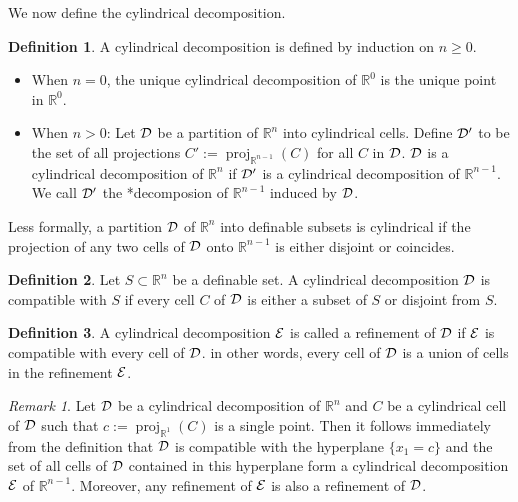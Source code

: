 \documentclass[
]{book}
\theoremstyle{definition}
\newtheorem{definition}{Definition}[chapter]
\theoremstyle{definition}
\theoremstyle{definition}
\theoremstyle{definition}
\theoremstyle{remark}
\newtheorem*{remark}{Remark}
\begin{document}
We now define the cylindrical decomposition.

\begin{definition}

A cylindrical decomposition is defined by induction on \(n \ge 0\).

\begin{itemize}
\item
  When \(n = 0\), the unique cylindrical decomposition of \(\mathbb{R}^0\) is the unique point in \(\mathbb{R}^0\).
\item
  When \(n > 0\): Let \(\cal D\) be a partition of \(\mathbb{R}^n\) into cylindrical cells.
  Define \(\cal D'\) to be the set of all projections \(C' := {\operatorname{proj}_{\mathbb{R}^{n-1}}}(C)\) for all \(C\) in \(\cal D\).
  \(\cal D\) is a cylindrical decomposition of \(\mathbb{R}^n\) if \(\cal D'\) is a cylindrical decomposition of \(\mathbb{R}^{n-1}\). We call \(\cal D'\) the *decomposion of \(\mathbb{R}^{n-1}\) induced by \(\cal D\).
\end{itemize}

\end{definition}

Less formally, a partition \(\cal D\) of \(\mathbb{R}^n\) into definable subsets is cylindrical if the projection of any two cells of \(\cal D\) onto \(\mathbb{R}^{n-1}\) is either disjoint or coincides.

\begin{definition}
Let \(S \subset \mathbb{R}^n\) be a definable set. A cylindrical decomposition \(\cal D\) is compatible with \(S\) if every cell \(C\) of \(\cal D\) is either a subset of \(S\) or disjoint from \(S\).
\end{definition}

\begin{definition}
A cylindrical decomposition \(\cal E\) is called a refinement of \(\cal D\) if \(\cal E\) is compatible with every cell of \(\cal D\). in other words, every cell of \(\cal D\) is a union of cells in the refinement \(\cal E\).
\end{definition}

\begin{remark}
\citep[Remark 3.8]{bgv15}
Let \(\cal D\) be a cylindrical decomposition of \(\mathbb{R}^n\) and \(C\) be a cylindrical cell of \(\cal D\) such that \(c := {\operatorname{proj}_{\mathbb{R}^{1}}}(C)\) is a single point. Then it follows immediately from the definition that \(\cal D\) is compatible with the hyperplane \(\{ x_1 = c \}\) and the set of all cells of \(\cal D\) contained in this hyperplane form a cylindrical decomposition \(\cal E\) of \(\mathbb{R}^{n-1}\). Moreover, any refinement of \(\cal E\) is also a refinement of \(\cal D\).
\end{remark}
\end{document}
